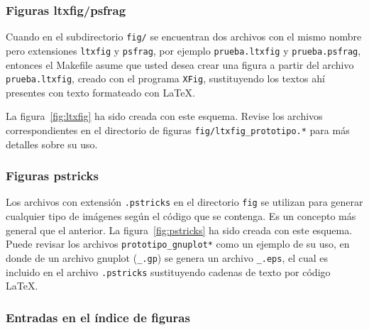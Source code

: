 \subsubsection{Figuras ltxfig/psfrag}

Cuando en el subdirectorio \texttt{fig/} se encuentran dos archivos con el
mismo nombre pero extensiones \texttt{ltxfig} y \texttt{psfrag}, por ejemplo
\texttt{prueba.ltxfig} y \texttt{prueba.psfrag}, entonces el Makefile asume que
usted desea crear una figura a partir del archivo \texttt{prueba.ltxfig},
creado con el programa \texttt{XFig}, sustituyendo los textos ahí presentes con
texto formateado con LaTeX.

La figura~\ref{fig:ltxfig} ha sido creada con este esquema.  Revise los
archivos correspondientes en el directorio de figuras
\texttt{fig/ltxfig\_prototipo.*} para más detalles sobre su uso.


\subsubsection{Figuras pstricks}  

Los archivos con extensión \texttt{.pstricks} en el directorio \texttt{fig} se
utilizan para generar cualquier tipo de imágenes según el código que se
contenga.  Es un concepto más general que el anterior.  La
figura~\ref{fig:pstricks} ha sido creada con este esquema.  Puede revisar los
archivos \texttt{prototipo\_gnuplot*} como un ejemplo de su uso, en donde de un
archivo gnuplot (\texttt{\_.gp}) se genera un archivo \texttt{\_.eps}, el cual
es incluido en el archivo \texttt{.pstricks} sustituyendo cadenas de texto por
código LaTeX.


\subsubsection{Entradas en el índice de figuras}

